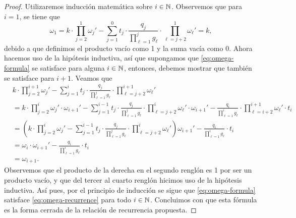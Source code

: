 \begin{proof}
	Utilizaremos inducción matemática sobre $i \in \mathbb{N}$. Observemos que para $i = 1$, se tiene que
	\begin{equation*}
		\omega_1 =
		k \cdot \prod_{j=2}^{1} \omega_j'
		- \sum_{j=1}^{0}
		t_j \cdot
		\frac{q_j}{\prod_{\ell=1}^{j}g_\ell}
		\cdot \prod_{\ell=j+2}^{1}\omega_\ell'
		= k,
	\end{equation*}
	debido a que definimos el producto vacío como 1 y la suma vacía como 0. Ahora hacemos uso de la
	hipótesis inductiva, así que supongamos que \eqref{eq:omega-formula} se satisface para alguna $i
	\in \mathbb{N}$, entonces, debemos mostrar que también se satisface para $i + 1$. Veamos que
	\begin{align*}
		&k \cdot \prod_{j=2}^{i + 1} \omega_j'
		- \sum_{j=1}^{i}
		t_j \cdot
		\frac{q_j}{\prod_{\ell=1}^{j}g_\ell}
		\cdot \prod_{\ell=j+2}^{i + 1}\omega_\ell' \\
		&=
		k \cdot \prod_{j=2}^{i} \omega_j' \cdot \omega_{i+1}'
		- \sum_{j=1}^{i - 1}
		t_j \cdot
		\frac{q_j}{\prod_{\ell=1}^{j}g_\ell}
		\cdot \prod_{\ell=j+2}^{i}\omega_\ell' \cdot \omega_{i + 1}'
		- \frac{q_i}{\prod_{\ell = 1}^{i}g_\ell}
		\cdot \prod_{\ell = i + 2}^{i + 1}\omega_\ell' \cdot t_i \\
		&= 
		\left( k \cdot \prod_{j=2}^{i} \omega_j'
		- \sum_{j=1}^{i - 1}
		t_j \cdot
		\frac{q_j}{\prod_{\ell=1}^{j}g_\ell}
		\cdot \prod_{\ell=j+2}^{i}\omega_\ell' \right) \omega_{i+1}'
		- \frac{q_i}{\prod_{\ell = 1}^{i}g_\ell} \cdot t_i  \\
		&= \omega_i \cdot \omega_{i + 1}' - \frac{q_i}{\prod_{\ell = 1}^{i}g_\ell} \cdot t_i \\
		&= \omega_{i+1}.
	\end{align*}
	Observemos que el producto de la derecha en el segundo renglón es 1 por ser un producto vacío, y
	que del tercer al cuarto renglón hicimos uso de la hipótesis inductiva. Así pues, por el
	principio de inducción se sigue que \eqref{eq:omega-formula} satisface
	\eqref{eq:omega-recurrence} para todo $i \in \mathbb{N}$. Concluimos con que esta fórmula es la forma
	cerrada de la relación de recurrencia propuesta.
\end{proof}

